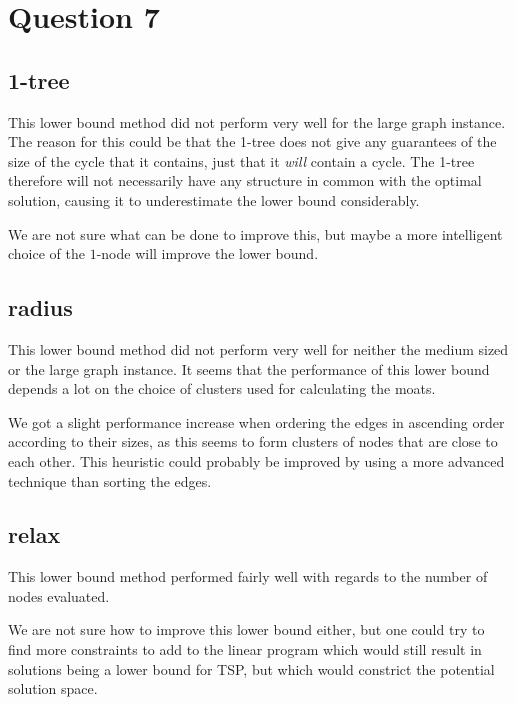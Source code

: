 \documentclass[a4paper, 10pt, oneside, article]{memoir}
\begin{document}
\section*{Question 7}

\subsection{1-tree}

This lower bound method did not perform very well for the large graph
instance. The reason for this could be that the 1-tree does not give
any guarantees of the size of the cycle that it contains, just that it
\emph{will} contain a cycle. The 1-tree therefore will not necessarily
have any structure in common with the optimal solution, causing it to
underestimate the lower bound considerably.

We are not sure what can be done to improve this, but maybe a more
intelligent choice of the $1$-node will improve the lower bound.


\subsection{radius}

This lower bound method did not perform very well for neither the
medium sized or the large graph instance. It seems that the
performance of this lower bound depends a lot on the choice of
clusters used for calculating the moats.

We got a slight performance increase when ordering the edges in
ascending order according to their sizes, as this seems to form
clusters of nodes that are close to each other. This heuristic could
probably be improved by using a more advanced technique than sorting
the edges.


\subsection{relax}

This lower bound method performed fairly well with regards to the
number of nodes evaluated.

We are not sure how to improve this lower bound either, but one could
try to find more constraints to add to the linear program which would
still result in solutions being a lower bound for TSP, but which would
constrict the potential solution space.




\end{document}
